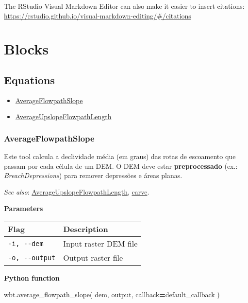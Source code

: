 \documentclass[
]{book}
\newenvironment{Shaded}{\begin{snugshade}}{\end{snugshade}}
\newcommand{\NormalTok}[1]{#1}
\newcommand{\OperatorTok}[1]{\textcolor[rgb]{0.81,0.36,0.00}{\textbf{#1}}}
\providecommand{\tightlist}{%
  \setlength{\itemsep}{0pt}\setlength{\parskip}{0pt}}
\theoremstyle{definition}
\theoremstyle{definition}
\theoremstyle{definition}
\theoremstyle{definition}
\theoremstyle{remark}
\begin{document}
The RStudio Visual Markdown Editor can also make it easier to insert citations: \url{https://rstudio.github.io/visual-markdown-editing/\#/citations}

\chapter{Blocks}\label{blocks}

\section{Equations}\label{equations}

\begin{itemize}
\tightlist
\item
  \hyperref[AverageFlowpathSlope]{AverageFlowpathSlope}
\item
  \hyperref[AverageUpslopeFlowpathLength]{AverageUpslopeFlowpathLength}
\end{itemize}

\subsection{AverageFlowpathSlope}\label{AverageFlowpathSlope}

Este tool calcula a declividade média (em graus) das rotas de escoamento que passam por cada célula de um DEM.
O DEM deve estar \textbf{preprocessado} (ex.: \emph{BreachDepressions}) para remover depressões e áreas planas.

\emph{See also}: \hyperref[AverageUpslopeFlowpathLength]{AverageUpslopeFlowpathLength}, \hyperref[carve]{carve}.

\textbf{Parameters}

\begin{longtable}[]{@{}ll@{}}
\toprule\noalign{}
Flag & Description \\
\midrule\noalign{}
\endhead
\bottomrule\noalign{}
\endlastfoot
\texttt{-i,\ -\/-dem} & Input raster DEM file \\
\texttt{-o,\ -\/-output} & Output raster file \\
\end{longtable}

\textbf{Python function}

\begin{Shaded}
\begin{Highlighting}[]
\NormalTok{wbt.average\_flowpath\_slope(}
\NormalTok{    dem,}
\NormalTok{    output,}
\NormalTok{    callback}\OperatorTok{=}\NormalTok{default\_callback}
\NormalTok{)}
\end{Highlighting}
\end{Shaded}
\end{document}
